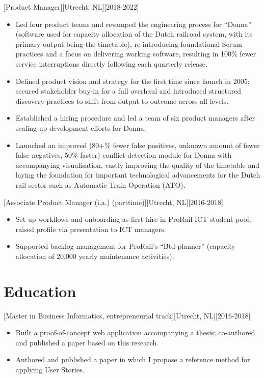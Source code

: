 \documentclass[10pt]{article}
\begin{document}
[Product Manager][Utrecht, NL][2018-2022]
\begin{itemize}
    \item Led four product teams and revamped the engineering process for \enquote{Donna} (software used for capacity allocation of the Dutch railroad system, with its primary output being the timetable), re-introducing foundational Scrum practices and a focus on delivering working software, resulting in 100\% fewer service interruptions directly following each quarterly release.
    \item Defined product vision and strategy for the first time since launch in 2005; secured stakeholder buy-in for a full overhaul and introduced structured discovery practices to shift from output to outcome across all levels.
    \item Established a hiring procedure and led a team of six product managers after scaling up development efforts for Donna.
    \item Launched an improved (80+\% fewer false positives, unknown amount of fewer false negatives, 50\% faster) conflict-detection module for Donna with accompanying visualisation, vastly improving the quality of the timetable and laying the foundation for important technological advancements for the Dutch rail sector such as Automatic Train Operation (ATO).
\end{itemize}

[Associate Product Manager (i.a.) (parttime)][Utrecht, NL][2016-2018]
\begin{itemize}
    \item Set up workflows and onboarding as first hire in ProRail ICT student pool; raised profile via presentation to ICT managers.
    \item Supported backlog management for ProRail's \enquote{Btd-planner} (capacity allocation of 20.000 yearly maintenance activities).
\end{itemize}

\section{Education}
\label{sec:school}

[Master in Business Informatics, entrepreneurial track][Utrecht, NL][2016-2018]
\begin{itemize}
    \item Built a proof-of-concept web application accompanying a thesis; co-authored and published a paper based on this research.
    \item Authored and published a paper in which I propose a reference method for applying User Stories.
\end{itemize}
\end{document}
